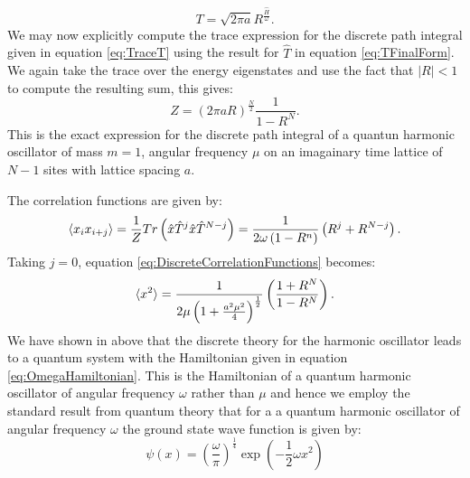 \documentclass[12pt]{article}
\begin{document}
\begin{equation}
	\label{eq:TFinalForm}
	T = \sqrt{2\pi a} R^{\frac{\hat{H}}{\omega}}.
\end{equation}
We may now explicitly compute the trace expression for the discrete path integral given in equation \ref{eq:TraceT} using the result for $\hat{T}$ in equation \ref{eq:TFinalForm}. We again take the trace over the energy eigenstates and use the fact that $|R|<1$ to compute the resulting sum, this gives:
\begin{equation}
	\label{eq:DiscretePathIntegral}
	Z = \left(2\pi aR\right)^{\frac{N}{2}}\frac{1}{1-R^N}.
\end{equation}
This is the exact expression for the discrete path integral of a quantun harmonic oscillator of mass $m=1$, angular frequency $\mu$ on an imagainary time lattice of $N-1$ sites with lattice spacing $a$.

The correlation functions are given by:
\begin{equation}
	\label{eq:DiscreteCorrelationFunctions}
	\braket{x_ix_{i+j}} = \frac{1}{Z}Tr\left(\hat{x}\hat{T}^j\hat{x}\hat{T}^{N-j}\right) = \frac{1}{2\omega\left(1-R^{n}\right)}\left(R^{j}+R^{N-j}\right).
\end{equation}
Taking $j=0$, equation \ref{eq:DiscreteCorrelationFunctions} becomes:
\begin{equation}
	\label{eq:XSquaredExpectation}
	\braket{x^2} = \frac{1}{2\mu\left(1+\frac{a^2\mu^2}{4}\right)^\frac{1}{2}}\left(\frac{1+R^N}{1-R^N}\right).
\end{equation}
We have shown in above that the discrete theory for the harmonic oscillator leads to a quantum system with the Hamiltonian given in equation \ref{eq:OmegaHamiltonian}. This is the Hamiltonian of a quantum harmonic oscillator of angular frequency $\omega$ rather than $\mu$ and hence we employ the standard result from quantum theory that for a a quantum harmonic oscillator of angular frequency $\omega$ the ground state wave function is given by: 
\begin{equation}
	\label{eq:DiscreteGroundStateWaveFunction2}
	\psi(x) =\left(\frac{\omega}{\pi}\right)^\frac{1}{4}\exp\left(-\frac{1}{2}\omega x^2\right)
\end{equation}
\end{document}
